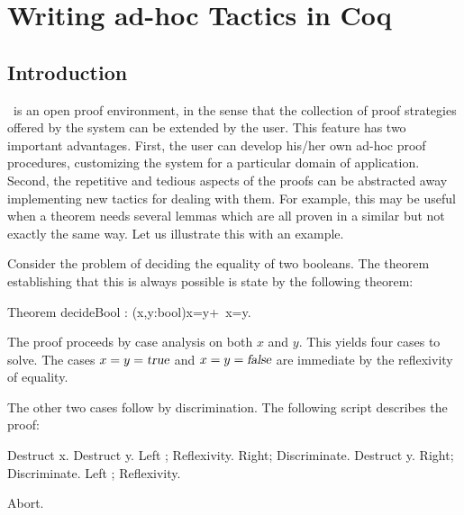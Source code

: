 %

\chapter[Writing ad-hoc Tactics in Coq]{Writing ad-hoc Tactics in Coq\label{WritingTactics}}

\section{Introduction}

\Coq\ is an open proof environment, in the sense that the collection of
proof strategies offered by the system can be extended by the user.
This feature has two important advantages. First, the user can develop
his/her own ad-hoc proof procedures, customizing the system for a
particular domain of application. Second, the repetitive and tedious
aspects of the proofs can be abstracted away implementing new tactics
for dealing with them. For example, this may be useful when a theorem
needs several lemmas which are all proven in a similar but not exactly
the same way. Let us illustrate this with an example.

Consider the problem of deciding the equality of two booleans. The
theorem establishing that this is always possible is state by 
the following theorem:

\begin{coq_example*}
Theorem decideBool : (x,y:bool){x=y}+{~x=y}.
\end{coq_example*}

The proof proceeds by case analysis on both $x$ and $y$. This yields
four cases to solve. The cases $x=y=\textsl{true}$ and
$x=y=\textsl{false}$ are immediate by the reflexivity of equality.

The other two cases follow by discrimination. The following script
describes the proof:

\begin{coq_example*}
Destruct x.
  Destruct y.
    Left ; Reflexivity.
    Right; Discriminate.
  Destruct y.
    Right; Discriminate.
    Left ; Reflexivity.
\end{coq_example*}
\begin{coq_eval}
Abort.
\end{coq_eval}

